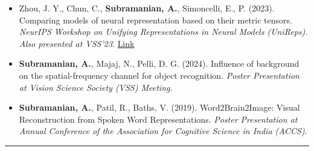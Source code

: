 \documentclass[10pt,letterpaper]{article}
\begin{document}
\begin{itemize}[leftmargin=1em,itemsep=0.3em]
    \item Zhou, J. Y., Chun, C., \textbf{Subramanian, A.}, Simoncelli, E., P. (2023). Comparing models of neural representation based on their metric tensors. \textit{NeurIPS Workshop on Unifying Representations in Neural Models (UniReps). Also presented at VSS'23}. \href{https://openreview.net/forum?id=mDr0o2WU2n}{Link}

    \item \textbf{Subramanian, A.}, Majaj, N., Pelli, D. G. (2024). Influence of background on the spatial-frequency channel for object recognition. \textit{Poster Presentation at Vision Science Society (VSS) Meeting}.

    \item \textbf{Subramanian, A.}, Patil, R., Baths, V. (2019). Word2Brain2Image: Visual Reconstruction from Spoken Word Representations. \textit{Poster Presentation at Annual Conference of the Association for Cognitive Science in India (ACCS)}.
    
\end{itemize}

\hrule
\vspace{-1em}
\end{document}
